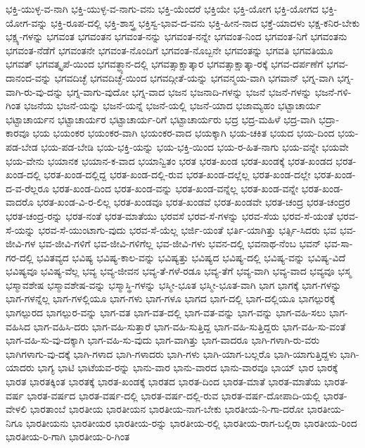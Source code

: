 {ಭಕ್ತಿ-ಯುಳ್ಳ-ವ-ನಾಗಿ
ಭಕ್ತಿ-ಯುಳ್ಳ-ವ-ನಾಗು-ವನು
ಭಕ್ತಿ-ಯೆಂದರೆ
ಭಕ್ತಿಯೇ
ಭಕ್ತಿ-ಯೋಗ
ಭಕ್ತಿ-ಯೋಗದ
ಭಕ್ತಿ-ಯೋಗ-ವನ್ನು
ಭಕ್ತಿ-ರೂಪ-ದಲ್ಲಿ
ಭಕ್ತಿ-ಶಾಸ್ತ್ರ
ಭಕ್ತಿಸ್ವ-ಭಾವ-ದ-ವನು
ಭಕ್ತಿ-ಹೀನ-ನಾದ
ಭಕ್ತೆ-ಯಾದಳು
ಭಕ್ಷ-ಕನಿರ-ಬೇಕು
ಭಕ್ಷ್ಯ-ಗಳನ್ನು
ಭಗವಂತ
ಭಗವಂತನ
ಭಗವಂತ-ನನ್ನು
ಭಗವಂತ-ನನ್ನೇ
ಭಗವಂತ-ನಿಂದ
ಭಗವಂತ-ನಿಗೆ
ಭಗವಂತನು
ಭಗವಂತ-ನೆಡೆಗೆ
ಭಗವಂತನೇ
ಭಗವಂತ-ನೊಂದಿಗೆ
ಭಗವಂತ-ನೊಬ್ಬನೇ
ಭಗವಂತನ್ನು
ಭಗವತಿ
ಭಗವತಿಯೂ
ಭಗವತ್
ಭಗವತ್ಕೃಪೆ-ಯಿಂದ
ಭಗವತ್ಧ್ಯಾನ-ದಲ್ಲಿ
ಭಗವತ್ಸಾಕ್ಷಾತ್ಕಾರ
ಭಗವತ್ಸಾಕ್ಷಾತ್ಕಾ-ರಕ್ಕೆ
ಭಗವ-ದರ್ಪಣೆಗೆ
ಭಗವ-ದಾನಂದ-ವನ್ನು
ಭಗವದಿಚ್ಛೆ
ಭಗವದಿಚ್ಛೆ-ಯಿಂದ
ಭಗವದ್ಗೀತೆ-ಯನ್ನು
ಭಗವನ್ಮಯ-ವಾಗಿ
ಭಗವಾನ್
ಭಗ್ನ-ವಾಗಿ
ಭಗ್ನ-ವಾಗಿ-ರು-ವು-ದನ್ನು
ಭಗ್ನ-ವಾಗು-ವುದೋ
ಭಗ್ನ-ವಾದ
ಭಜನ
ಭಜನಾದಿ-ಗಳನ್ನು
ಭಜನೆ
ಭಜನೆ-ಗಳನ್ನು
ಭಜನೆ-ಗಳಿ-ಗಿಂತ
ಭಜನೆಯ
ಭಜನೆ-ಯನ್ನು
ಭಜನೆ-ಯನ್ನೆ
ಭಜನೆ-ಯಲ್ಲಿ
ಭಜನೆ-ಯಾದ
ಭಜಾಮ್ಯಹಂ
ಭಟ್ಟಾಚಾರ್ಯ
ಭಟ್ಟಾಚಾರ್ಯನ
ಭಟ್ಟಾಚಾರ್ಯರ
ಭಟ್ಟಾಚಾರ್ಯ-ರಿಗೆ
ಭಟ್ಟಾಚಾರ್ಯರು
ಭದ್ರ
ಭದ್ರ-ಮಹಿಳೆ
ಭದ್ರ-ವಾಗಿ
ಭದ್ರಾ-ಕಾರವೂ
ಭಯ
ಭಯಂಕರ
ಭಯಂಕರ-ವಾಗಿ
ಭಯಂಕರ-ವಾದ
ಭಯಕ್ಕಾಗಿ
ಭಯ-ಚಕಿತ
ಭಯದ
ಭಯ-ದಿಂದ
ಭಯ-ಪಡ-ಬೇಡ
ಭಯ-ಪಡ-ಬೇಡಿ
ಭಯ-ಭಕ್ತಿ-ಯನ್ನು
ಭಯ-ಭಕ್ತಿ-ಯಿಂದ
ಭಯ-ರ-ಹಿತ-ನಾಗು
ಭಯ-ವನ್ನೇ
ಭಯವೇ
ಭಯ-ವೇನು
ಭಯಾನಕ
ಭಯಾನ-ಕ-ವಾದ
ಭಯಾನ್ವಿತಂ
ಭರತ
ಭರತ-ಖಂಡ
ಭರತ-ಖಂಡಕ್ಕೆ
ಭರತ-ಖಂಡದ
ಭರತ-ಖಂಡ-ದಲ್ಲಿ
ಭರತ-ಖಂಡ-ದಲ್ಲಿದ್ದ
ಭರತ-ಖಂಡ-ದಲ್ಲಿ-ರುವ
ಭರತ-ಖಂಡ-ದಲ್ಲೆಲ್ಲ
ಭರತ-ಖಂಡ-ದಲ್ಲೇ
ಭರತ-ಖಂಡ-ದ-ವ-ರೆಲ್ಲರೂ
ಭರತ-ಖಂಡ-ದಿಂದ
ಭರತ-ಖಂಡ-ವನ್ನು
ಭರತ-ಖಂಡ-ವನ್ನೆಲ್ಲ
ಭರತ-ಖಂಡ-ವನ್ನೇ
ಭರತ-ಖಂಡ-ವಾದರೊ
ಭರತ-ಖಂಡ-ವಿ-ರ-ಲಿಲ್ಲ
ಭರತ-ಖಂಡವೂ
ಭರತ-ಖಂಡವೆ
ಭರತ-ಖಂಡವೇ
ಭರತ-ಚಂದ್ರ
ಭರತ-ಚಂದ್ರರ
ಭರತ-ಚಂದ್ರ-ರನ್ನು
ಭರತ-ನಂತೆ
ಭರತ-ಮಾತೆಯು
ಭರವಸೆ
ಭರವ-ಸೆ-ಗಳನ್ನು
ಭರವ-ಸೆಯ
ಭರವ-ಸೆ-ಯಂತೆ
ಭರವ-ಸೆ-ಯನ್ನು
ಭರವ-ಸೆ-ಯುಂಟಾಗು-ವುದು
ಭರವ-ಸೆ-ಯೆಲ್ಲ
ಭರ್ಜಿ-ಯಂತೆ
ಭರ್ತಿ-ಯಾಗಿತ್ತು
ಭರ್ತ್ಸಿ-ಸಿದರು
ಭವ
ಭವ-ಜೀವಿ-ಗಳ
ಭವ-ಜೀವಿ-ಗಳಿಗೆ
ಭವ-ಜೀವಿ-ಗಳಿಗೆಲ್ಲ
ಭವ-ಜೀವಿ-ಗಳು
ಭವನ-ದಲ್ಲಿ
ಭವನಾಥ-ನೆಂಬ
ಭವನ್
ಭವ-ಸಾ-ಗರ-ದಲ್ಲಿ
ಭವಿತವ್ಯದ
ಭವಿಷ್ಯ
ಭವಿಷ್ಯ-ಕಾಲ-ವನ್ನು
ಭವಿಷ್ಯತ್ತು
ಭವಿಷ್ಯದ
ಭವಿಷ್ಯ-ದಲ್ಲಿ
ಭವಿಷ್ಯ-ವನ್ನು
ಭವಿಷ್ಯ-ವಿದೆ
ಭವಿಷ್ಯವೂ
ಭವಿಷ್ಯ-ವೆಲ್ಲ
ಭವ್ಯ
ಭವ್ಯ-ಜೀವನ
ಭವ್ಯ-ತೆ-ಗಳೆ-ರಡೂ
ಭವ್ಯ-ತೆಗೆ
ಭವ್ಯ-ವಾಗಿ
ಭವ್ಯ-ವಾದ
ಭವ್ಯವೂ
ಭಸ್ಮ
ಭಸ್ಮಾವಶೇಷ
ಭಸ್ಮಾವಶೇಷ-ವನ್ನು
ಭಸ್ಮಾಸ್ಥಿ-ಗಳನ್ನು
ಭಸ್ಮೀ-ಭೂತ
ಭಸ್ಮೀ-ಭೂತ-ವಾಗಿ
ಭಾಗ
ಭಾಗಕ್ಕೆ
ಭಾಗ-ಗಳನ್ನು
ಭಾಗ-ಗಳನ್ನೆಲ್ಲ
ಭಾಗ-ಗಳಲ್ಲಿಯೂ
ಭಾಗ-ಗಳು
ಭಾಗ-ಗಳೂ
ಭಾಗದ
ಭಾಗ-ದಲ್ಲಿ
ಭಾಗ-ದಲ್ಲಿಯೂ
ಭಾಗಲ್ಪುರಕ್ಕೆ
ಭಾಗಲ್ಪುರದ
ಭಾಗಲ್ಪುರ-ವನ್ನು
ಭಾಗ-ವತ
ಭಾಗ-ವತ-ದಲ್ಲಿ
ಭಾಗ-ವತ-ವನ್ನು
ಭಾಗ-ವನ್ನು
ಭಾಗ-ವಹಿ-ಸಲು
ಭಾಗ-ವಹಿಸಿದ
ಭಾಗ-ವಹಿಸಿ-ದರು
ಭಾಗ-ವಹಿ-ಸುತ್ತಾರೆ
ಭಾಗ-ವಹಿ-ಸುತ್ತಿದ್ದ
ಭಾಗ-ವಹಿ-ಸುತ್ತಿದ್ದರು
ಭಾಗ-ವಹಿ-ಸು-ವಂತೆ
ಭಾಗ-ವಹಿ-ಸು-ವು-ದಕ್ಕಾಗಿ
ಭಾಗ-ವಹಿ-ಸು-ವುದು
ಭಾಗ-ವಾಗಿತ್ತು
ಭಾಗ-ವಾದರೂ
ಭಾಗಿ-ಗಳಾಗಿ-ರು-ವರು
ಭಾಗಿಗಳಾಗು-ವು-ದಕ್ಕೆ
ಭಾಗಿ-ಗಳಾದ
ಭಾಗಿ-ಗಳಾದರು
ಭಾಗಿ-ಗಳು
ಭಾಗಿ-ಯಾಗ-ಬಲ್ಲರೊ
ಭಾಗಿ-ಯಾಗುತ್ತಿದ್ದಳು
ಭಾಗಿ-ಯಾದರು
ಭಾಗ್ಯ
ಭಾಟಿ
ಭಾಟೆಯವ-ರನ್ನು
ಭಾನು-ವಾರ
ಭಾನು-ವಾರದ
ಭಾನು-ವಾರವೂ
ಭಾಯ್
ಭಾರ
ಭಾರಕ್ಕೆ
ಭಾರತ
ಭಾರತಕ್ಕಿಂತ
ಭಾರತಕ್ಕೆ
ಭಾರತ-ಖಂಡಕ್ಕೆ
ಭಾರತದ
ಭಾರತ-ದಿಂದ
ಭಾರತ-ಮಾತೆ
ಭಾರತ-ಮಾತೆಯ
ಭಾರತ-ವರ್ಷ
ಭಾರತ-ವರ್ಷದ
ಭಾರತ-ವರ್ಷ-ದಲ್ಲಿ
ಭಾರತ-ವರ್ಷ-ದಲ್ಲಿ-ರುವ
ಭಾರತ-ವರ್ಷ-ದೋಪಾದಿ-ಯಲ್ಲಿ
ಭಾರತ-ವೇಳಲಿ
ಭಾರತಾಂಬೆ
ಭಾರತೀಯ
ಭಾರತೀಯನ
ಭಾರತೀಯ-ನಾಗ-ಬೇಕು
ಭಾರತೀಯ-ನಿ-ಗಾ-ದರೋ
ಭಾರತೀಯ-ನಿಗೂ
ಭಾರತೀಯನು
ಭಾರತೀಯರ
ಭಾರತೀಯ-ರನ್ನು
ಭಾರತೀಯ-ರಲ್ಲಿ
ಭಾರತೀಯ-ರಾಗ-ಬಲ್ಲಿರಾ
ಭಾರತೀಯ-ರಿಂದ
ಭಾರತೀಯ-ರಿ-ಗಾಗಿ
ಭಾರತೀಯ-ರಿ-ಗಿಂತ
}
